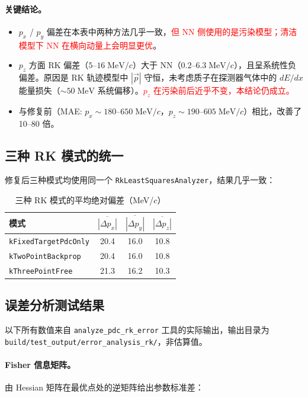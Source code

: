 \documentclass[a4paper, 11pt]{article}
\begin{document}
\paragraph{关键结论。}
\begin{itemize}[nosep]
  \item $p_x$ / $p_y$ 偏差在本表中两种方法几乎一致，\textcolor{red}{但 NN 侧使用的是污染模型；清洁模型下 NN 在横向动量上会明显更优}。
  \item $p_z$ 方面 RK 偏差（$5\text{--}16\;\mathrm{MeV}/c$）大于 NN（$0.2\text{--}6.3\;\mathrm{MeV}/c$），且呈系统性负偏差。原因是 RK 轨迹模型中 $|\vec{p}|$ 守恒，未考虑质子在探测器气体中的 $dE/dx$ 能量损失（$\sim 50\;\mathrm{MeV}$ 系统偏移）。\textcolor{red}{$p_z$ 在污染前后近乎不变，本结论仍成立。}
  \item 与修复前（MAE: $p_x \sim 180\text{--}650\;\mathrm{MeV}/c$，$p_z \sim 190\text{--}605\;\mathrm{MeV}/c$）相比，改善了 10--80 倍。
\end{itemize}

\subsection{三种 RK 模式的统一}

修复后三种模式均使用同一个 \texttt{RkLeastSquaresAnalyzer}，结果几乎一致：

\begin{table}[H]
\centering
\caption{三种 RK 模式的平均绝对偏差（MeV/$c$）}
\begin{tabular}{lccc}
\toprule
模式 & $\overline{|\Delta p_x|}$ & $\overline{|\Delta p_y|}$ & $\overline{|\Delta p_z|}$ \\
\midrule
\texttt{kFixedTargetPdcOnly} & 20.4 & 16.0 & 10.8 \\
\texttt{kTwoPointBackprop} & 20.4 & 16.0 & 10.8 \\
\texttt{kThreePointFree} & 21.3 & 16.2 & 10.3 \\
\bottomrule
\end{tabular}
\end{table}

\subsection{误差分析测试结果}
\label{sec:error_results}

以下所有数值来自 \texttt{analyze\_pdc\_rk\_error} 工具的实际输出，输出目录为 \texttt{build/test\_output/error\_analysis\_rk/}，非估算值。

\paragraph{Fisher 信息矩阵。}
由 Hessian 矩阵在最优点处的逆矩阵给出参数标准差：
\end{document}
